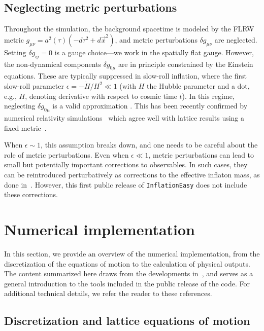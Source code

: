 \documentclass[aps, nofootinbib,superscriptaddress, preprintnumbers, longbibliography]{article}
\begin{document}
 
	\subsection{Neglecting metric perturbations}
	Throughout the simulation, the background spacetime is modeled by the FLRW metric $g_{\mu\nu} = a^2(\tau)(-d\tau^2 + d\vec{x}^2)$, and metric perturbations $\delta g_{\mu\nu}$ are neglected. Setting $\delta g_{ij} = 0$ is a gauge choice—we work in the spatially flat gauge. However, the non-dynamical components $\delta g_{0\mu}$ are in principle constrained by the Einstein equations. These are typically suppressed in slow-roll inflation, where the first slow-roll parameter $\epsilon = -\dot{H}/H^2 \ll 1$ (with $H$ the Hubble parameter and a dot, e.g., $\dot{H}$, denoting derivative with respect to cosmic time $t$). In this regime, neglecting $\delta g_{0\mu}$ is a valid approximation \cite{Caravano:2022yyv,Caravano:2024moy}. This has been recently confirmed by numerical relativity simulations~\cite{Launay:2025kef} which agree well with lattice results using a fixed metric~\cite{Caravano:2022yyv,Caravano:2024tlp,Caravano:2024xsb,Caravano:2024moy}.

When $\epsilon \sim 1$, this assumption breaks down, and one needs to be careful about the role of metric perturbations. Even when $\epsilon \ll 1$, metric perturbations can lead to small but potentially important corrections to observables. In such cases, they can be reintroduced perturbatively as corrections to the effective inflaton mass, as done in~\cite{Caravano:2024xsb}. However, this first public release of \texttt{InflationEasy} does not include these corrections.
	
	
    \section{Numerical implementation}
    \label{sec:implementation}
    In this section, we provide an overview of the numerical implementation, from the discretization of the equations of motion to the calculation of physical outputs. The content summarized here draws from the developments in~\cite{Caravano:2021pgc,Caravano:2021bfn,Caravano:2022epk,Caravano:2022yyv,Caravano:2024tlp,Caravano:2024xsb,Caravano:2024moy}, and serves as a general introduction to the tools included in the public release of the code. For additional technical details, we refer the reader to these references.

\subsection{Discretization and lattice equations of motion}
\label{sec:discrete}
\end{document}

